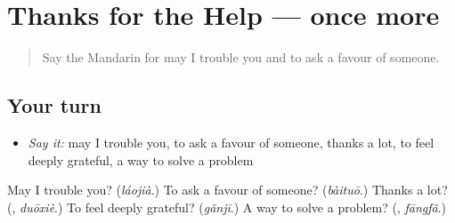 \section[(dialogue)]{Thanks for the Help — once more}

\label{lesson:ZH-R457-review-final-457}



\begin{quote}
Say the Mandarin for may I trouble you and to ask a favour of someone.
\end{quote}

\subsection*{Your turn}
\begin{itemize}
\raggedright
  \item \emph{Say it:} may I trouble you, to ask a favour of someone, thanks a lot, to feel deeply grateful, a way to solve a problem
\end{itemize}

\begin{tcolorbox}[breakable,colback=teal!4,colframe=teal!35!black,title={Before you move on}]
May I trouble you? (\emph{láojià}.) To ask a favour of someone? (\emph{bàituō}.) Thanks a lot? (\textbf{}, \emph{duōxiè}.) To feel deeply grateful? (\emph{gǎnjī}.) A way to solve a problem? (\textbf{}, \emph{fāngfǎ}.)
\end{tcolorbox}
